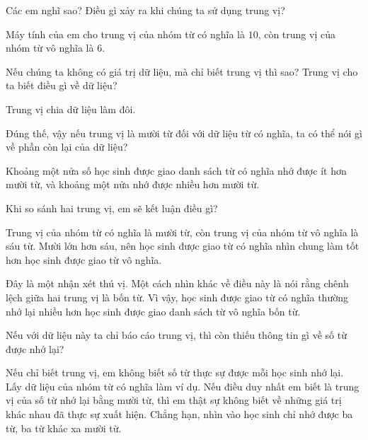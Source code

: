 {\begin{scriptlist}
      \item [Giáo viên:] Các em nghĩ sao? Điều gì xảy ra khi chúng ta sử dụng trung vị?
      
      \item [Học sinh D:] Máy tính của em cho trung vị của nhóm từ có nghĩa là $10$, còn trung vị của nhóm từ vô nghĩa là $6$.
      
      \item [Giáo viên:] Nếu chúng ta không có giá trị dữ liệu, mà chỉ biết trung vị thì sao? Trung vị cho ta biết điều gì về dữ liệu?
      
      \item [Học sinh D:] Trung vị chia dữ liệu làm đôi.\vspace{\baselineskip}
      
      \item [Giáo viên:] Đúng thế, vậy nếu trung vị là mười từ đối với dữ liệu từ có nghĩa, ta có thể nói gì về phần còn lại của dữ liệu?
      
      \item [Học sinh F:] Khoảng một nửa số học sinh được giao danh sách từ có nghĩa nhớ được ít hơn mười từ, và khoảng một nửa nhớ được nhiều hơn mười từ.\vspace{\baselineskip}
      
      \item [Giáo viên:] Khi so sánh hai trung vị, em sẽ kết luận điều gì?
      
      \item [Học sinh F:] Trung vị của nhóm từ có nghĩa là mười từ, còn trung vị của nhóm từ vô nghĩa là sáu từ. Mười lớn hơn sáu, nên học sinh được giao từ có nghĩa nhìn chung làm tốt hơn học sinh được giao từ vô nghĩa.\vspace{\baselineskip}
      
      \item [Giáo viên:] Đây là một nhận xét thú vị. Một cách nhìn khác về điều này là nói rằng chênh lệch giữa hai trung vị là bốn từ. Vì vậy, học sinh được giao từ có nghĩa thường nhớ lại nhiều hơn học sinh được giao danh sách từ vô nghĩa bốn từ.\vspace{\baselineskip}
      
      \item [Giáo viên:] Nếu với dữ liệu này ta chỉ báo cáo trung vị, thì còn thiếu thông tin gì về số từ được nhớ lại?
        
      \item [Học sinh G:] Nếu chỉ biết trung vị, em không biết số từ thực sự được mỗi học sinh nhớ lại. Lấy dữ liệu của nhóm từ có nghĩa làm ví dụ. Nếu điều duy nhất em biết là trung vị của số từ nhớ lại bằng mười từ, thì em thật sự không biết về những giá trị khác nhau đã thực sự xuất hiện. Chẳng hạn, nhìn vào học sinh chỉ nhớ được ba từ, ba từ khác xa mười từ.\vspace{\baselineskip}
      

\end{scriptlist}}
